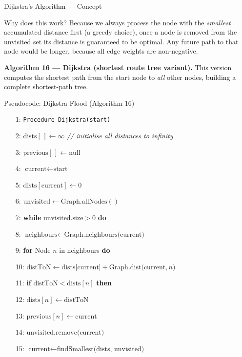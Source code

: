 \documentclass[aspectratio=169,10pt]{beamer}
\begin{document}
\begin{frame}[allowframebreaks]{Dijkstra's Algorithm --- Concept}
  \begin{alertblock}{Why does this work?}
    Because we always process the node with the \emph{smallest} accumulated
    distance first (a greedy choice), once a node is removed from the
    unvisited set its distance is guaranteed to be optimal.  Any future path
    to that node would be longer, because all edge weights are
    non-negative.
  \end{alertblock}

  \framebreak

  \textbf{Algorithm 16 --- Dijkstra (shortest route tree variant).}
  This version computes the shortest path from the start node to
  \emph{all} other nodes, building a complete shortest-path tree.

  \begin{block}{Pseudocode: Dijkstra Flood (Algorithm 16)}
  \begin{enumerate}\setcounter{enumi}{0}
    \item[\footnotesize 1:] \texttt{Procedure Dijkstra(start)}
    \item[\footnotesize 2:] \quad $\text{dists}[\,] \leftarrow \infty$ \hfill
      \textit{// initialise all distances to infinity}
    \item[\footnotesize 3:] \quad $\text{previous}[\,] \leftarrow \text{null}$
    \item[\footnotesize 4:] \quad $\text{current} \leftarrow \text{start}$
    \item[\footnotesize 5:] \quad $\text{dists}[\text{current}] \leftarrow 0$
    \item[\footnotesize 6:] \quad $\text{unvisited} \leftarrow
      \text{Graph.allNodes}()$
    \item[\footnotesize 7:] \quad \textbf{while} $\text{unvisited.size} > 0$
      \textbf{do}
    \item[\footnotesize 8:] \qquad $\text{neighbours} \leftarrow
      \text{Graph.neighbours(current)}$
    \item[\footnotesize 9:] \qquad \textbf{for} Node $n$ in neighbours
      \textbf{do}
    \item[\footnotesize 10:] \quad\qquad $\text{distToN} \leftarrow
      \text{dists[current]} + \text{Graph.dist(current}, n)$
    \item[\footnotesize 11:] \quad\qquad \textbf{if} $\text{distToN} <
      \text{dists}[n]$ \textbf{then}
    \item[\footnotesize 12:] \qquad\qquad $\text{dists}[n] \leftarrow
      \text{distToN}$
    \item[\footnotesize 13:] \qquad\qquad $\text{previous}[n] \leftarrow
      \text{current}$
    \item[\footnotesize 14:] \quad $\text{unvisited.remove(current)}$
    \item[\footnotesize 15:] \quad $\text{current} \leftarrow
      \text{findSmallest(dists, unvisited)}$
  \end{enumerate}
  \end{block}


\end{frame}
\end{document}

